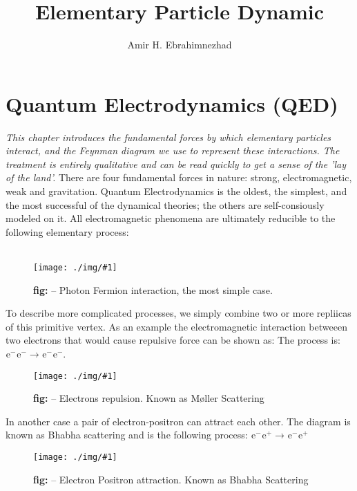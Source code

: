 \documentclass[10pt,a4paper]{article}
\title{Elementary Particle Dynamic}
\author{Amir H. Ebrahimnezhad}
\date{}
\newcounter{theo}
\newcounter{figurecounter}
\newcommand{\img}[3]{
    \begin{figure}[h!]
        \centering
        \captionsetup{justification=centering,margin=0cm,labelformat=empty}
        \texttt{[image: ./img/\#1]}
        \label{figure}
        \caption{\small\textbf{fig: \thefigurecounter} -- \textcolor{darkliver}{#3}}
    \end{figure}
    \addtocounter{figurecounter}{1}}
\newcommand{\ch}[5]{{}^{#2}_{#3}\!\text{#1}^{#4}_{#5}}
\newcommand{\electron}{\ch{e}{}{}{-}{}}
\newcommand{\positron}{\ch{e}{}{}{+}{}}
\begin{document}
        \maketitle
        \tableofcontents
        \section{Quantum Electrodynamics (QED)}
            \textit{This chapter introduces the fundamental forces by which elementary particles interact, and the Feynman diagram we use to represent these interactions. The treatment is entirely qualitative and can be read quickly to get a sense of the 'lay of the land'.}
            There are four fundamental forces in nature: strong, electromagnetic, weak and gravitation. Quantum Electrodynamics is the oldest, the simplest, and the most successful of the dynamical theories; the others are self-consiously modeled on it. All electromagnetic phenomena are ultimately reducible to the following elementary process:
            \\
            \\
            \img{pfinteraction}{0.3}{Photon Fermion interaction, the most simple case.}
            
            To describe more complicated processes, we simply combine two or more repliicas of this primitive vertex. As an example the electromagnetic interaction betweeen two electrons that would cause repulsive force can be shown as: The process is: $\electron \electron \rightarrow \electron \electron$.

            \img{mollerscattering}{0.2}{Electrons repulsion. Known as Møller Scattering}
            
            In another case a pair of electron-positron can attract each other. The diagram is known as Bhabha scattering and is the following process: $\electron \positron \rightarrow \electron \positron$

            \img{bhabhascattering}{0.2}{Electron Positron attraction. Known as Bhabha Scattering}
\end{document}
